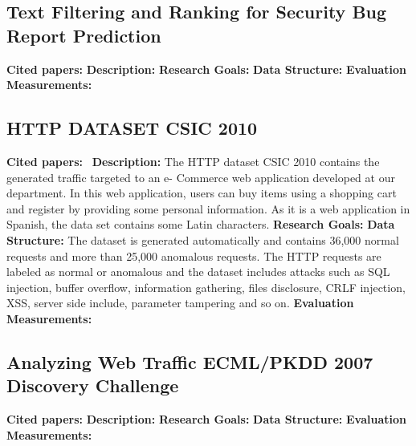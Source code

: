 \subsection{Text Filtering and Ranking for Security Bug Report Prediction}
\textbf{Cited papers:} \newline
\textbf{Description:} \newline
\textbf{Research Goals:}  \newline
\textbf{Data Structure:} \newline
\textbf{Evaluation Measurements:} \newline


\subsection{HTTP DATASET CSIC 2010}
\textbf{Cited papers:}~\cite{torrano2009self} \newline
\textbf{Description:}  The HTTP dataset CSIC 2010 contains the generated traffic targeted to an e- Commerce web application developed at our department. In this web application, users can buy items using a shopping cart and register by providing some personal information. As it is a web application in Spanish, the data set contains some Latin characters. \newline
\textbf{Research Goals:}  \newline
\textbf{Data Structure:} The dataset is generated automatically and contains 36,000 normal requests and more than 25,000 anomalous requests. The HTTP requests are labeled as normal or anomalous and the dataset includes attacks such as SQL injection, buffer overflow, information gathering, files disclosure, CRLF injection, XSS, server side include, parameter tampering and so on.\newline
\textbf{Evaluation Measurements:} \newline

\subsection{Analyzing Web Traffic ECML/PKDD 2007 Discovery Challenge}
\textbf{Cited papers:} \newline
\textbf{Description:} \newline
\textbf{Research Goals:}  \newline
\textbf{Data Structure:} \newline
\textbf{Evaluation Measurements:} \newline

